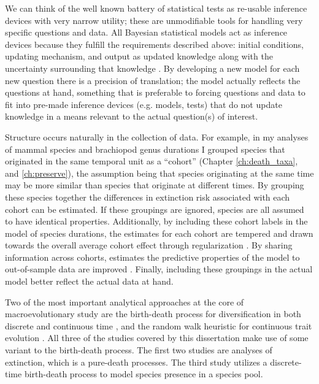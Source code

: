 We can think of the well known battery of statistical tests \citep{Sokal2011} as re-usable inference devices with very narrow utility; these are unmodifiable tools for handling very specific questions and data. All Bayesian statistical models act as inference devices because they fulfill the requirements described above: initial conditions, updating mechanism, and output as updated knowledge along with the uncertainty surrounding that knowledge \citep{McElreath2016,Jaynes2003a}. By developing a new model for each new question there is a precision of translation; the model actually reflects the questions at hand, something that is preferable to forcing questions and data to fit into pre-made inference devices (e.g. models, tests) that do not update knowledge in a means relevant to the actual question(s) of interest.

Structure occurs naturally in the collection of data. For example, in my analyses of mammal species and brachiopod genus durations I grouped species that originated in the same temporal unit as a ``cohort'' (Chapter \ref{ch:death_taxa}, and \ref{ch:preserve}), the assumption being that species originating at the same time may be more similar than species that originate at different times. By grouping these species together the differences in extinction risk associated with each cohort can be estimated. If these groupings are ignored, species are all assumed to have identical properties. Additionally, by including these cohort labels in the model of species durations, the estimates for each cohort are tempered and drawn towards the overall average cohort effect through regularization \citep{Gelman2013d,McElreath2016}. By sharing information across cohorts, estimates the predictive properties of the model to out-of-sample data are improved \citep{Gelman2013d,McElreath2016}. Finally, including these groupings in the actual model better reflect the actual data at hand.

Two of the most important analytical approaches at the core of macroevolutionary study are the birth-death process for diversification in both discrete and continuous time \citep{Raup1973,Raup1985,Nee1992,Nee1994a,Nee2001,Nee2006b,Stadler2013b}, and the random walk heuristic for continuous trait evolution \citep{Raup1974a,Felsenstein1985b,Bookstein1987b,Gingerich1993,Roopnarine2001a,Roopnarine2003b,Roopnarine1999,Sheets2001,Hunt2006a,Hunt2007a}. All three of the studies covered by this dissertation make use of some variant to the birth-death process. The first two studies are analyses of extinction, which is a pure-death processes. The third study utilizes a discrete-time birth-death process to model species presence in a species pool.

